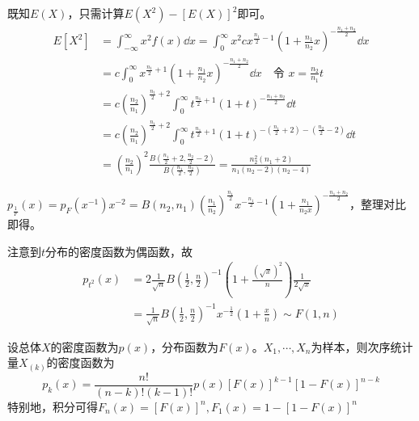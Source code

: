 \documentclass[UTF-8]{ctexbeamer}
\begin{document}
\begin{frame}
  既知$E(X)$，只需计算$E(X^{2})-[E(X)]^{2}$即可。
  \[
\begin{aligned}
E[X^2]&=\int_{-\infty}^\infty x^2 f(x)\dd x=\int_0^\infty x^2 cx^{\frac{n_1}{2}-1}(1+\frac{n_1}{n_2}x)^{-\frac{n_1+n_2}{2}}\dd x\\
&=c\int_0^\infty x^{\frac{n_1}{2}+1}(1+\frac{n_1}{n_2}x)^{-\frac{n_1+n_2}{2}}\dd x\quad \text{令 }x=\frac{n_2}{n_1}t\\
&=c(\frac{n_2}{n_1})^{\frac{n_1}{2}+2}\int_0^\infty t^{\frac{n_1}{2}+1}(1+t)^{-\frac{n_1+n_2}{2}}\dd t\\
&=c(\frac{n_2}{n_1})^{\frac{n_1}{2}+2}\int_0^\infty t^{\frac{n_1}{2}+1}(1+t)^{-(\frac{n_1}{2}+2)-(\frac{n_2}{2}-2)}\dd t\\
&=(\frac{n_2}{n_1})^{2}\frac{B(\frac{n_1}{2}+2,\frac{n_2}{2}-2)}{B(\frac{n_1}{2},\frac{n_2}{2})}=\frac{n_2^2(n_1+2)}{n_1(n_2-2)(n_2-4)}
\end{aligned}
\]

\end{frame}
\begin{frame}
  $p_{\frac{1}{F}}(x)=p_{F}(x^{-1})x^{-2}=B(n_{2},n_{1})(\frac{n_{1}}{n_{2}})^{\frac{n_{1}}{2}}x^{-\frac{n_{1}}{2}-1}(1+\frac{n_{1}}{n_{2}x})^{-\frac{n_{1}+n_{2}}{2}}$，整理对比即得。

  注意到$t$分布的密度函数为偶函数，故
  \[\begin{aligned}
      p_{t^{2}}(x)&=2\frac{1}{\sqrt{n}}B(\frac{1}{2},\frac{n}{2})^{-1}(1+\frac{(\sqrt{x})^{2}}{n})\frac{1}{2\sqrt{x}}\\
      &=\frac{1}{\sqrt{n}}B(\frac{1}{2},\frac{n}{2})^{-1}x^{-\frac{1}{2}}(1+\frac{x}{n})\sim F(1,n)
      \end{aligned}
    \]
\end{frame}



\begin{frame}
  \begin{Thm}
    设总体$X$的密度函数为$p(x)$，分布函数为$F(x)$。$X_{1},\cdots,X_{n}$为样本，则次序统计量$X_{(k)}$的密度函数为
    \[p_{k}(x)=\frac{n!}{(n-k)!(k-1)!}p(x)[F(x)]^{k-1}[1-F(x)]^{n-k}\]
    特别地，积分可得$F_{n}(x)=[F(x)]^{n},F_{1}(x)=1-[1-F(x)]^{n}$
  \end{Thm}
\end{frame}
\end{document}

